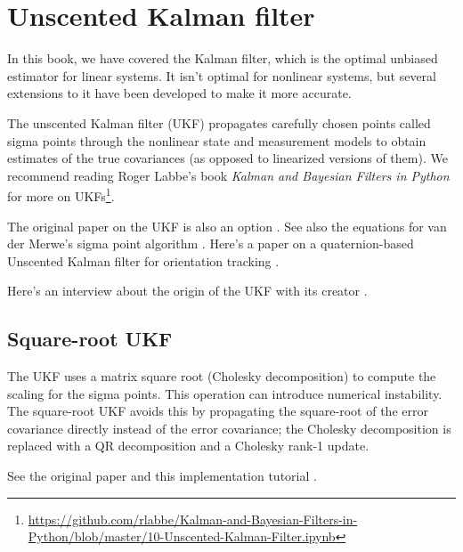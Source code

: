 \section{Unscented Kalman filter}
\label{sec:ukf}

In this book, we have covered the Kalman filter, which is the optimal unbiased
estimator for linear \glspl{system}. It isn't optimal for nonlinear
\glspl{system}, but several extensions to it have been developed to make it more
accurate.

The unscented Kalman filter (UKF) propagates carefully chosen points called
sigma points through the nonlinear state and measurement models to obtain
estimates of the true covariances (as opposed to linearized versions of them).
We recommend reading Roger Labbe's book \textit{Kalman and Bayesian Filters in
Python} for more on
UKFs\footnote{\url{https://github.com/rlabbe/Kalman-and-Bayesian-Filters-in-Python/blob/master/10-Unscented-Kalman-Filter.ipynb}}.

The original paper on the UKF is also an option \cite{bib:ukf}. See also the
equations for van der Merwe's sigma point algorithm \cite{bib:ukf_sigma_points}.
Here's a paper on a quaternion-based Unscented Kalman filter for orientation
tracking \cite{bib:ukf_state_tracking}.

Here's an interview about the origin of the UKF with its creator
\cite{bib:first-hand_the_ut}.

\subsection{Square-root UKF}

The UKF uses a matrix square root (Cholesky decomposition) to compute the
scaling for the sigma points. This operation can introduce numerical
instability. The square-root UKF avoids this by propagating the square-root of
the error covariance directly instead of the error covariance; the Cholesky
decomposition is replaced with a QR decomposition and a Cholesky rank-1 update.

See the original paper \cite{bib:ukf_square_root} and this implementation
tutorial \cite{bib:ukf_square_root_tutorial}.
